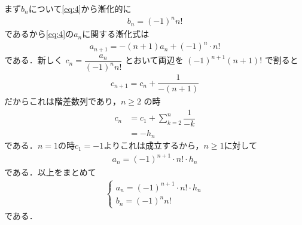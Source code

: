 \documentclass[../../main.tex]{subfiles}
\begin{document}
まず$b_n$について\cref{eq:4}から漸化的に
\begin{align}
  b_n = (-1)^n n! \label{eq:5}
\end{align}
であるから\cref{eq:4}の$a_n$に関する漸化式は
\begin{align}
  a_{n+1} = -(n+1) a_n + (-1)^n \cdot n!  \label{eq:6}
\end{align}
である．新しく $c_n = \dfrac{a_n}{(-1)^n n!}$ とおいて両辺を $(-1)^{n+1} (n+1)!$ で割ると
\begin{align}
  c_{n+1} = c_n + \dfrac{1}{-(n+1)}
\end{align}
だからこれは階差数列であり，$n \ge 2$ の時
\begin{align}
  c_n
  &= c_1 + \sum_{k=2}^n \dfrac{1}{-k} \\
  &= -h_n
\end{align}
である．$n=1$の時$c_1=-1$よりこれは成立するから，$n \ge 1$に対して
\begin{align}
  a_n = (-1)^{n+1} \cdot n! \cdot h_n
\end{align}
である．以上をまとめて
\begin{align}
  \begin{cases}
    a_n = (-1)^{n+1} \cdot n! \cdot h_n \\
    b_n = (-1)^n n!
  \end{cases}
\end{align}
である．

\newpage
\end{document}
